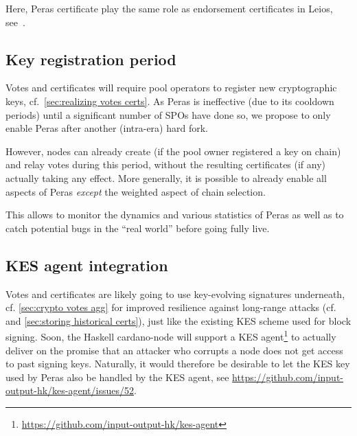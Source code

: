 Here, Peras certificate play the same role as endorsement certificates in Leios, see~\cite[Section 4.4.2]{leios-design-goals-concepts}.

\subsection{Key registration period}

Votes and certificates will require pool operators to register new cryptographic keys, cf.\ \cref{sec:realizing votes certs}.
As Peras is ineffective (due to its cooldown periods) until a significant number of SPOs have done so, we propose to only enable Peras after another (intra-era) hard fork.

However, nodes can already create (if the pool owner registered a key on chain) and relay votes during this period, without the resulting certificates (if any) actually taking any effect.
More generally, it is possible to already enable all aspects of Peras \emph{except} the weighted aspect of chain selection.

This allows to monitor the dynamics and various statistics of Peras as well as to catch potential bugs in the \enquote{real world} before going fully live.

\subsection{KES agent integration}

Votes and certificates are likely going to use key-evolving signatures underneath, cf. \cref{sec:crypto votes agg} for improved resilience against long-range attacks (cf.\ \cite{david2018ouroboros} and \cref{sec:storing historical certs}), just like the existing KES scheme used for block signing.
Soon, the Haskell cardano-node will support a KES agent\footnote{\url{https://github.com/input-output-hk/kes-agent}} to actually deliver on the promise that an attacker who corrupts a node does not get access to past signing keys.
Naturally, it would therefore be desirable to let the KES key used by Peras also be handled by the KES agent, see \url{https://github.com/input-output-hk/kes-agent/issues/52}.

